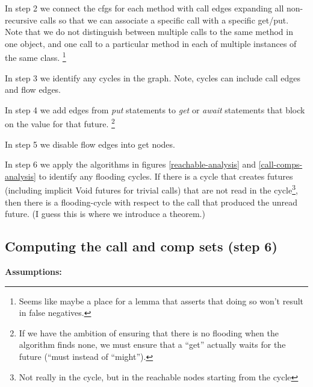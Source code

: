 \documentclass[12pt]{article}%
\begin{document}
In step 2 we connect the cfgs for each method with call edges expanding all non-recursive calls so that we can
associate a specific call with a specific get/put. Note that we do not distinguish between multiple calls to the same method in one
object, and one call to a particular method in each of multiple instances of the same class. 
\footnote{Seems like maybe a place for a lemma that asserts that doing so won't result in false negatives.}

In step 3 we identify any cycles in the graph. Note, cycles can include call edges and flow edges.

In step 4 we add edges from \emph{put} statements to \emph{get} or \emph{await} statements that block on the value for that future.
\footnote{If we have the ambition of ensuring that 
there is no flooding when the algorithm finds none,
we must ensure that a ``get'' actually waits for the future
(``must instead of ``might'').}

In step 5 we disable flow edges into get nodes.

In step 6 we apply the algorithms in figures \ref{reachable-analysis} and  \ref{call-comps-analysis} to identify any flooding cycles.
If there is a cycle that creates futures (including implicit Void futures for trivial calls) that are not read
in the cycle\footnote{Not really in the cycle, but in the reachable nodes starting from the cycle}, 
then there is a flooding-cycle with respect to the call that produced the unread future. 
(I guess this is where we introduce a theorem.)

\subsection{Computing the call and comp sets (step 6)}

\textbf{Assumptions:}
\end{document}
